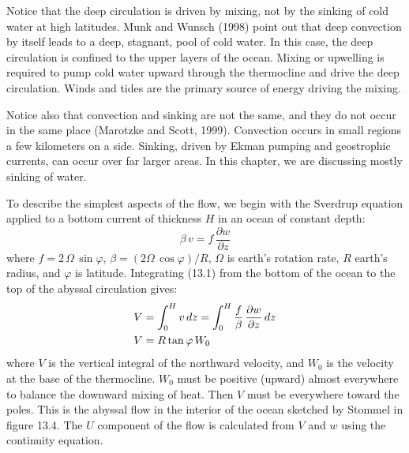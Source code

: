 Notice that the deep circulation is driven by
mixing, not by the sinking of cold water
at high latitudes. Munk and Wunsch (1998) point out that deep
convection by itself leads to a deep, stagnant, pool of cold water. In
this case, the deep circulation is confined to the upper layers of the
ocean. Mixing or upwelling is
required to pump cold water upward through the
thermocline
and drive the deep circulation. Winds and tides are the primary source
of energy driving the mixing.

Notice also that convection and sinking are not the same, and they do
not occur in the same place (Marotzke and Scott, 1999). Convection
occurs in small regions a few kilometers on a side. Sinking, driven by
Ekman pumping and geostrophic currents, can occur
over far larger areas. In this chapter, we are discussing mostly
sinking of water.

To describe the simplest aspects of the flow, we begin with the
Sverdrup equation applied to a bottom current of thickness $H$ in an
ocean of constant depth:
\begin{equation}
\beta\,v =f\,\frac{\partial{w}}{\partial{z}}
\end{equation}
where $f =2\,\Omega\,\sin \varphi$,
$\beta = \left(2\Omega\,\cos \varphi \right)/{R}$,
$\Omega$ is earth's rotation rate, $R$ earth's
radius, and $\varphi$ is latitude. Integrating (13.1) from the bottom
of the ocean to the top of the abyssal circulation gives:
\begin{align}
V &= \int_{0}^{H} v\,dz = \int_{0}^{H}
\frac{f}{\beta}\,\frac{\partial{w}}{\partial{z}}\,dz \notag \\
V &= R \tan \varphi \,W_0
\end{align}
where $V$ is the vertical integral of the northward velocity, and
$W_0$ is the velocity at the base of the
thermocline. $W_0$ must be
positive (upward) almost everywhere to balance the downward
mixing of heat. Then $V$ must be
everywhere toward the poles. This is the abyssal flow in the interior
of the ocean sketched by Stommel in figure 13.4.  The $U$ component of
the flow is calculated from $V$ and $w$ using the continuity equation.

